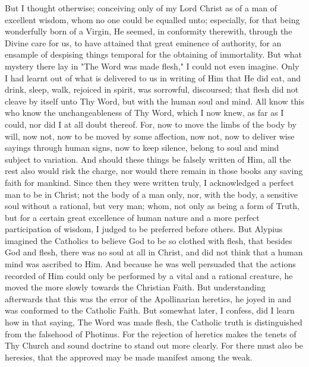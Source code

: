 \documentclass[b5paper,openright,12pt,twoside]{book}
\begin{document}
But I thought otherwise; conceiving only of my Lord Christ as of a man
of excellent wisdom, whom no one could be equalled unto; especially,
for that being wonderfully born of a Virgin, He seemed, in conformity
therewith, through the Divine care for us, to have attained that great
eminence of authority, for an ensample of despising things temporal for
the obtaining of immortality. But what mystery there lay in "The Word
was made flesh," I could not even imagine. Only I had learnt out of what
is delivered to us in writing of Him that He did eat, and drink, sleep,
walk, rejoiced in spirit, was sorrowful, discoursed; that flesh did not
cleave by itself unto Thy Word, but with the human soul and mind. All
know this who know the unchangeableness of Thy Word, which I now knew,
as far as I could, nor did I at all doubt thereof. For, now to move the
limbs of the body by will, now not, now to be moved by some affection,
now not, now to deliver wise sayings through human signs, now to keep
silence, belong to soul and mind subject to variation. And should these
things be falsely written of Him, all the rest also would risk the
charge, nor would there remain in those books any saving faith for
mankind. Since then they were written truly, I acknowledged a perfect
man to be in Christ; not the body of a man only, nor, with the body, a
sensitive soul without a rational, but very man; whom, not only as being
a form of Truth, but for a certain great excellence of human nature and
a more perfect participation of wisdom, I judged to be preferred before
others. But Alypius imagined the Catholics to believe God to be so
clothed with flesh, that besides God and flesh, there was no soul at all
in Christ, and did not think that a human mind was ascribed to Him. And
because he was well persuaded that the actions recorded of Him could
only be performed by a vital and a rational creature, he moved the more
slowly towards the Christian Faith. But understanding afterwards that
this was the error of the Apollinarian heretics, he joyed in and was
conformed to the Catholic Faith. But somewhat later, I confess, did I
learn how in that saying, The Word was made flesh, the Catholic truth
is distinguished from the falsehood of Photinus. For the rejection of
heretics makes the tenets of Thy Church and sound doctrine to stand out
more clearly. For there must also be heresies, that the approved may be
made manifest among the weak.
\end{document}
